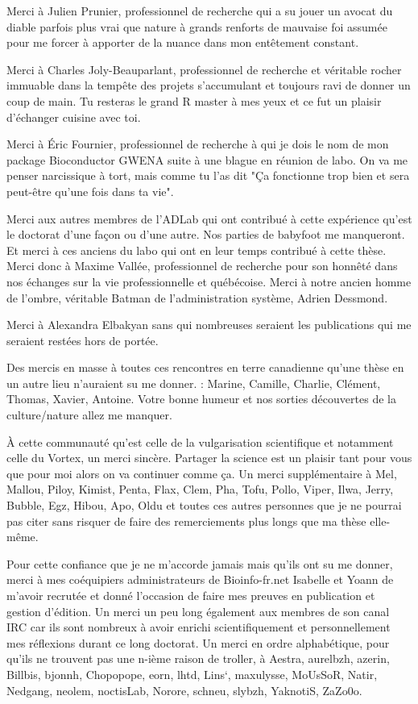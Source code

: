 Merci à Julien Prunier, professionnel de recherche qui a su jouer un avocat du diable parfois plus vrai que nature à grands renforts de mauvaise foi assumée pour me forcer à apporter de la nuance dans mon entêtement constant. 

Merci à Charles Joly-Beauparlant, professionnel de recherche et véritable rocher immuable dans la tempête des projets s'accumulant et toujours ravi de donner un coup de main. Tu resteras le grand R master à mes yeux et ce fut un plaisir d'échanger cuisine avec toi.

Merci à Éric Fournier, professionnel de recherche à qui je dois le nom de mon package Bioconductor GWENA suite à une blague en réunion de labo. On va me penser narcissique à tort, mais comme tu l'as dit "Ça fonctionne trop bien et sera peut-être qu'une fois dans ta vie".

Merci aux autres membres de l'ADLab qui ont contribué à cette expérience qu'est le doctorat d'une façon ou d'une autre. Nos parties de babyfoot me manqueront. Et merci à ces anciens du labo qui ont en leur temps contribué à cette thèse. Merci donc à Maxime Vallée, professionnel de recherche pour son honnêté dans nos échanges sur la vie professionnelle et québécoise. Merci à notre ancien homme de l'ombre, véritable Batman de l'administration système, Adrien Dessmond.

Merci à Alexandra Elbakyan sans qui nombreuses seraient les publications qui me seraient restées hors de portée.

Des mercis en masse à toutes ces rencontres en terre canadienne qu'une thèse en un autre lieu n'auraient su me donner. : Marine, Camille, Charlie, Clément, Thomas, Xavier, Antoine. Votre bonne humeur et nos sorties découvertes de la culture/nature allez me manquer.

À cette communauté qu'est celle de la vulgarisation scientifique et notamment celle du Vortex, un merci sincère. Partager la science est un plaisir tant pour vous que pour moi alors on va continuer comme ça. Un merci supplémentaire à Mel, Mallou, Piloy, Kimist, Penta, Flax, Clem, Pha, Tofu, Pollo, Viper, Ilwa, Jerry, Bubble, Egz, Hibou, Apo, Oldu et toutes ces autres personnes que je ne pourrai pas citer sans risquer de faire des remerciements plus longs que ma thèse elle-même.

Pour cette confiance que je ne m'accorde jamais mais qu'ils ont su me donner, merci à mes coéquipiers administrateurs de Bioinfo-fr.net Isabelle et Yoann de m'avoir recrutée et donné l'occasion de faire mes preuves en publication et gestion d'édition. Un merci un peu long également aux membres de son canal IRC car ils sont nombreux à avoir enrichi scientifiquement et personnellement mes réflexions durant ce long doctorat. Un merci en ordre alphabétique, pour qu'ils ne trouvent pas une n-ième raison de troller, à Aestra, aurelbzh, azerin, Billbis, bjonnh, Chopopope, eorn, lhtd, Lins`, maxulysse, MoUsSoR, Natir, Nedgang, neolem, noctisLab, Norore, schneu, slybzh, YaknotiS, ZaZo0o.

